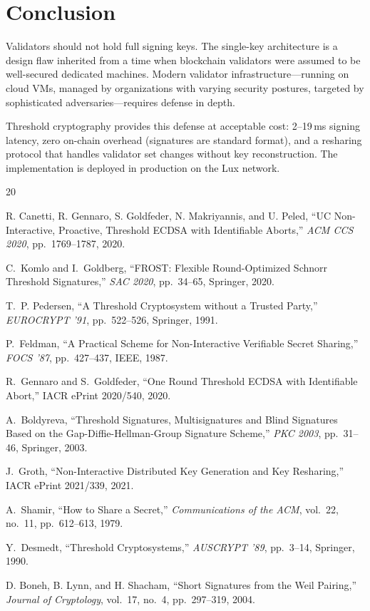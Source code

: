 \section{Conclusion}


Validators should not hold full signing keys. The single-key architecture is a
design flaw inherited from a time when blockchain validators were assumed to be
well-secured dedicated machines. Modern validator infrastructure---running on
cloud VMs, managed by organizations with varying security postures, targeted by
sophisticated adversaries---requires defense in depth.

Threshold cryptography provides this defense at acceptable cost: 2--19\,ms signing
latency, zero on-chain overhead (signatures are standard format), and a resharing
protocol that handles validator set changes without key reconstruction. The
implementation is deployed in production on the Lux network.

\begin{thebibliography}{20}

R. Canetti, R. Gennaro, S. Goldfeder, N. Makriyannis, and U. Peled, ``UC
Non-Interactive, Proactive, Threshold ECDSA with Identifiable Aborts,''
\emph{ACM CCS 2020}, pp.~1769--1787, 2020.

C.~Komlo and I.~Goldberg, ``FROST: Flexible Round-Optimized Schnorr Threshold
Signatures,'' \emph{SAC 2020}, pp.~34--65, Springer, 2020.

T.~P. Pedersen, ``A Threshold Cryptosystem without a Trusted Party,''
\emph{EUROCRYPT '91}, pp.~522--526, Springer, 1991.

P.~Feldman, ``A Practical Scheme for Non-Interactive Verifiable Secret Sharing,''
\emph{FOCS '87}, pp.~427--437, IEEE, 1987.

R.~Gennaro and S.~Goldfeder, ``One Round Threshold ECDSA with Identifiable Abort,''
IACR ePrint 2020/540, 2020.

A.~Boldyreva, ``Threshold Signatures, Multisignatures and Blind Signatures Based on
the Gap-Diffie-Hellman-Group Signature Scheme,'' \emph{PKC 2003}, pp.~31--46,
Springer, 2003.

J.~Groth, ``Non-Interactive Distributed Key Generation and Key Resharing,''
IACR ePrint 2021/339, 2021.

A.~Shamir, ``How to Share a Secret,'' \emph{Communications of the ACM}, vol.~22,
no.~11, pp.~612--613, 1979.

Y.~Desmedt, ``Threshold Cryptosystems,'' \emph{AUSCRYPT '89}, pp.~3--14,
Springer, 1990.

D. Boneh, B. Lynn, and H. Shacham, ``Short Signatures from the Weil Pairing,''
\emph{Journal of Cryptology}, vol.~17, no.~4, pp.~297--319, 2004.

\end{thebibliography}

